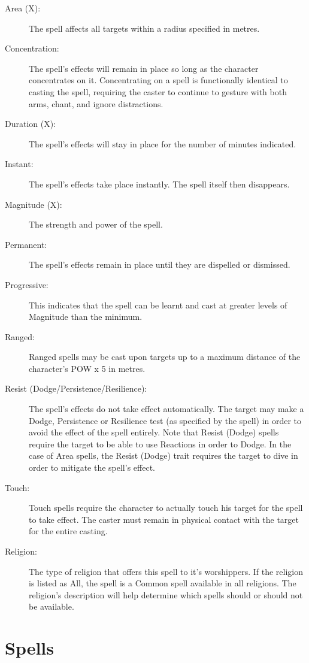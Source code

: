 \begin{description}
	\item[Area (X):] The spell affects all targets within a radius specified in metres.
	\item[Concentration:] The spell’s effects will remain in place so long as the character concentrates on it. Concentrating on a spell is functionally identical to casting the spell, requiring the caster to continue to gesture with both arms, chant, and ignore distractions.
	\item[Duration (X):] The spell’s effects will stay in place for the number of minutes indicated. 
	\item[Instant:] The spell’s effects take place instantly. The spell itself then disappears. 
	\item[Magnitude (X):] The strength and power of the spell.
	\item[Permanent:] The spell’s effects remain in place until they are dispelled or dismissed.
	\item[Progressive:] This indicates that the spell can be learnt and cast at greater levels of Magnitude than the minimum.
	\item[Ranged:] Ranged spells may be cast upon targets up to a maximum distance of the character’s POW x 5 in metres.
	\item[Resist (Dodge/Persistence/Resilience):] The spell’s effects do not take effect automatically. The target may make a Dodge, Persistence or Resilience test (as specified by the spell) in order to avoid the effect of the spell entirely. Note that Resist (Dodge) spells require the target to be able to use Reactions in order to Dodge. In the case of Area spells, the Resist (Dodge) trait requires the target to dive in order to mitigate the spell’s effect. 
	\item[Touch:] Touch spells require the character to actually touch his target for the spell to take effect. The caster must remain in physical contact with the target for the entire casting.
	\item[Religion:] The type of religion that offers this spell to it’s worshippers. If the religion is listed as All, the spell is a Common spell available in all religions. The religion’s description will help determine which spells should or should not be available. 
\end{description}

\section{Spells}

